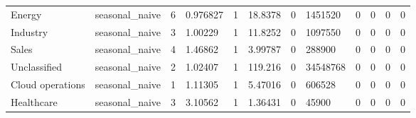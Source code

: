 \begin{tabular}{llllllllllll}
Energy & seasonal\_naive & 6 & 0.976827 & 1 & 18.8378 & 0 & 1451520 & 0 & 0 & 0 & 0 \\
Industry & seasonal\_naive & 3 & 1.00229 & 1 & 11.8252 & 0 & 1097550 & 0 & 0 & 0 & 0 \\
Sales & seasonal\_naive & 4 & 1.46862 & 1 & 3.99787 & 0 & 288900 & 0 & 0 & 0 & 0 \\
Unclassified & seasonal\_naive & 2 & 1.02407 & 1 & 119.216 & 0 & 34548768 & 0 & 0 & 0 & 0 \\
Cloud operations & seasonal\_naive & 1 & 1.11305 & 1 & 5.47016 & 0 & 606528 & 0 & 0 & 0 & 0 \\
Healthcare & seasonal\_naive & 3 & 3.10562 & 1 & 1.36431 & 0 & 45900 & 0 & 0 & 0 & 0 \\
\bottomrule
\end{tabular}
